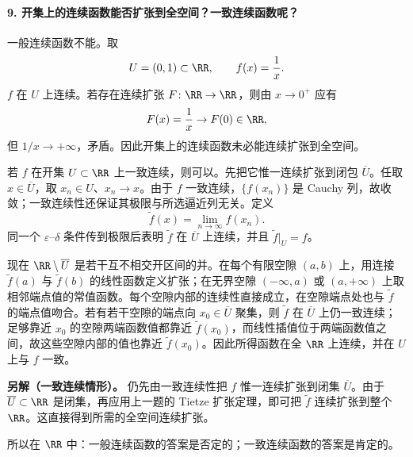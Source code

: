 \paragraph{9. 开集上的连续函数能否扩张到全空间？一致连续函数呢？}
\begin{xsolution}
一般连续函数不能。取
\[
  U=(0,1)\subset\RR,
  \qquad
  f(x)=\frac1x.
\]
$f$ 在 $U$ 上连续。若存在连续扩张 $F\colon\RR\to\RR$，则由 $x\to0^+$ 应有
\[
  F(x)=\frac1x\to F(0)\in\RR,
\]
但 $1/x\to+\infty$，矛盾。因此开集上的连续函数未必能连续扩张到全空间。

若 $f$ 在开集 $U\subset\RR$ 上一致连续，则可以。先把它惟一连续扩张到闭包 $\overline U$。任取 $x\in\overline U$，取 $x_n\in U$、$x_n\to x$。由于 $f$ 一致连续，$\{f(x_n)\}$ 是 Cauchy 列，故收敛；一致连续性还保证其极限与所选逼近列无关。定义
\[
  \widetilde f(x)=\lim_{n\to\infty}f(x_n).
\]
同一个 $\varepsilon$--$\delta$ 条件传到极限后表明 $\widetilde f$ 在 $\overline U$ 上连续，并且 $\widetilde f|_U=f$。

现在 $\RR\setminus\overline U$ 是若干互不相交开区间的并。在每个有限空隙 $(a,b)$ 上，用连接 $\widetilde f(a)$ 与 $\widetilde f(b)$ 的线性函数定义扩张；在无界空隙 $(-\infty,a)$ 或 $(a,+\infty)$ 上取相邻端点值的常值函数。每个空隙内部的连续性直接成立，在空隙端点处也与 $\widetilde f$ 的端点值吻合。若有若干空隙的端点向 $x_0\in\overline U$ 聚集，则 $\widetilde f$ 在 $\overline U$ 上仍一致连续；足够靠近 $x_0$ 的空隙两端函数值都靠近 $\widetilde f(x_0)$，而线性插值位于两端函数值之间，故这些空隙内部的值也靠近 $\widetilde f(x_0)$。因此所得函数在全 $\RR$ 上连续，并在 $U$ 上与 $f$ 一致。

\textbf{另解（一致连续情形）。} 仍先由一致连续性把 $f$ 惟一连续扩张到闭集 $\overline U$。由于 $\overline U\subset\RR$ 是闭集，再应用上一题的 Tietze 扩张定理，即可把 $\widetilde f$ 连续扩张到整个 $\RR$。这直接得到所需的全空间连续扩张。

所以在 $\RR$ 中：一般连续函数的答案是否定的；一致连续函数的答案是肯定的。
\end{xsolution}

